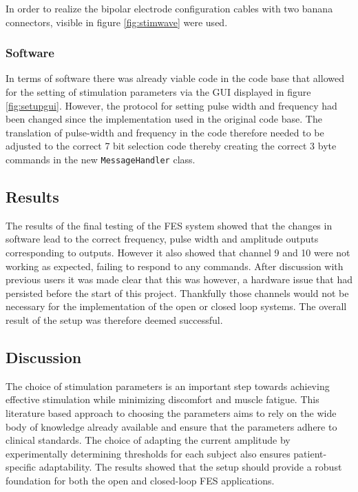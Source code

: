 In order to realize the bipolar electrode configuration cables with two banana connectors, visible in figure \ref{fig:stimwave} were used. 

\subsubsection{Software}
In terms of software there was already viable code in the code base that allowed for the setting of stimulation parameters via the GUI displayed in figure \ref{fig:setupgui}. However, the protocol for setting pulse width and frequency had been changed since the implementation used in the original code base. The translation of pulse-width and frequency in the code therefore needed to be adjusted to the correct 7 bit selection code thereby creating the correct 3 byte commands in the new \texttt{MessageHandler} class.

\subsection{Results}
The results of the final testing of the FES system showed that the changes in software lead to the correct frequency, pulse width and amplitude outputs corresponding to outputs. However it also showed that channel 9 and 10 were not working as expected, failing to respond to any commands. After discussion with previous users it was made clear that this was however, a hardware issue that had persisted before the start of this project. Thankfully those channels would not be necessary for the implementation of the open or closed loop systems. The overall result of the setup was therefore deemed successful.

\subsection{Discussion}
The choice of stimulation parameters is an important step towards achieving effective stimulation while minimizing discomfort and muscle fatigue. This literature based approach to choosing the parameters aims to rely on the wide body of knowledge already available and ensure that the parameters adhere to clinical standards. The choice of adapting the current amplitude by experimentally determining thresholds for each subject also ensures patient-specific adaptability. The results showed that the setup should provide a robust foundation for both the open and closed-loop FES applications.

